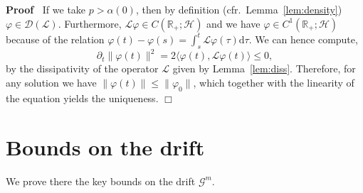 \documentclass[10pt]{article}
\newcommand{\mathd}{\mathrm{d}}
\newenvironment{proof}{\noindent\textbf{Proof\ }}{\hspace*{\fill}$\Box$\medskip}
\begin{document}
\begin{proof}
  If we take $p > \alpha (0)$, then by definition
  (cfr.~Lemma~\ref{lem:density}) $\varphi \in \mathcal{D} (\mathcal{L})$.
  Furthermore, $\mathcal{L} \varphi \in C (\mathbb{R}_+ ; \mathcal{H})$ and we
  have $\varphi \in C^1 (\mathbb{R}_+ ; \mathcal{H})$ because of the relation
  $\varphi (t) - \varphi (s) = \int_s^t \mathcal{L} \varphi (\tau) \mathd
  \tau$. We can hence compute,
  \[ \partial_t \| \varphi (t) \|^2 = 2 \langle \varphi (t), \mathcal{L}
     \varphi (t) \rangle \leqslant 0, \]
  by the dissipativity of the operator $\mathcal{L}$ given by
  Lemma~\ref{lem:diss}. Therefore, for any solution we have $\| \varphi (t) \|
  \leqslant \| \varphi_0 \|$, which together with the linearity of the
  equation yields the uniqueness.
\end{proof}

\section{Bounds on the drift}\label{sec:bounds}

We prove there the key bounds on the drift $\mathcal{G}^m$.
\end{document}
